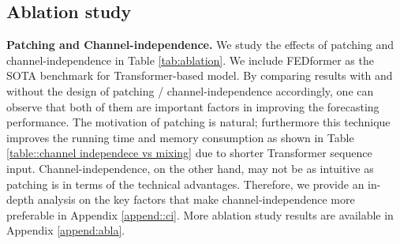 \documentclass{article} \usepackage{iclr2023_conference,times}
\begin{document}
\subsection{Ablation study}
\label{sec::ablation}

\textbf{Patching and Channel-independence.} We study the effects of patching and channel-independence in Table \ref{tab:ablation}. We include FEDformer as the SOTA benchmark for Transformer-based model.  By comparing results with and without the design of patching / channel-independence accordingly, one can observe that both of them are important factors in improving the forecasting performance. The motivation of patching is natural; furthermore this technique improves the running time and memory consumption as shown in Table \ref{table::channel independece vs mixing} due to shorter Transformer sequence input. Channel-independence, on the other hand, may not be as intuitive as patching is in terms of the technical advantages. Therefore, we provide an in-depth analysis on the key factors that make channel-independence more preferable in Appendix \ref{append::ci}. More ablation study results are available in Appendix \ref{append:abla}.
\end{document}
